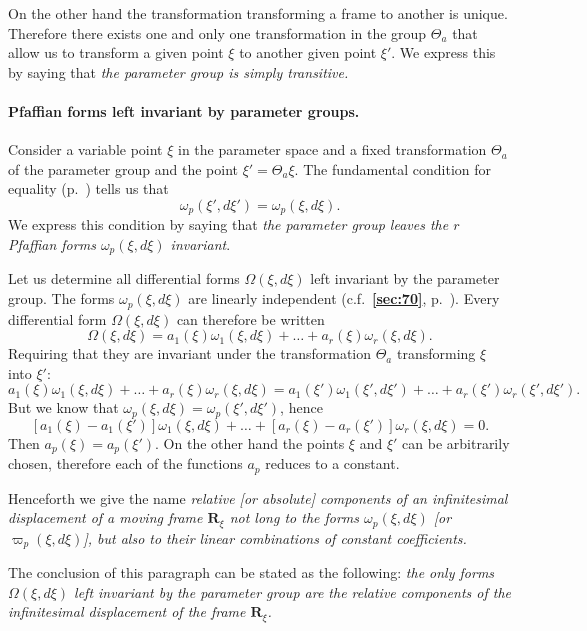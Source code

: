 \documentclass[leqno,11pt]{book}
\numberwithin{equation}{chapter}
\theoremstyle{shape1}
\theoremstyle{shapesmall}
\newcommand{\fsref}[1]{{\rm\textsection\textbf{\ref{sec:#1}}}}
\newcommand{\vp}{\varpi}
\begin{document}
On the other hand the transformation transforming a frame to another is unique. Therefore there exists one and only one transformation in the group $\Theta_{a}$ that allow us to transform a given point $\xi$ to another given point $\xi'$. We express this by saying that \emph{the parameter group is simply transitive.}

\paragraph{Pfaffian forms left invariant by parameter groups.}
\label{sec:80}
Consider a variable point $\xi$ in the parameter space and a fixed transformation $\Theta_{a}$ of the parameter group and the point $\xi'=\Theta_{a}\xi$. The fundamental condition for equality (p.~\pageref{sec:76}) tells us that
\[
\omega_{p}(\xi',d\xi')=\omega_{p}(\xi,d\xi).
\]
We express this condition by saying that \emph{the parameter group leaves the $r$ Pfaffian forms $\omega_{p}(\xi,d\xi)$ invariant}.

Let us determine all differential forms $\Omega(\xi,d\xi)$ left invariant by the parameter group. The forms $\omega_{p}(\xi,d\xi)$ are linearly independent (c.f.~\fsref{70}, p.~\pageref{sec:80}). Every differential form $\Omega(\xi,d\xi)$ can therefore be written
\[
\Omega(\xi,d\xi)=a_{1}(\xi)\omega_{1}(\xi,d\xi)+\dots+a_{r}(\xi)\omega_{r}(\xi,d\xi).
\]
Requiring that they are invariant under the transformation $\Theta_{a}$ transforming $\xi$ into $\xi'$:
\[
a_{1}(\xi)\omega_{1}(\xi,d\xi)+\dots+a_{r}(\xi)\omega_{r}(\xi,d\xi)=a_{1}(\xi')\omega_{1}(\xi',d\xi')+\dots+a_{r}(\xi')\omega_{r}(\xi',d\xi').
\]
But we know that $\omega_{p}(\xi,d\xi)=\omega_{p}(\xi',d\xi')$, hence
\[
[a_{1}(\xi)-a_{1}(\xi')]\omega_{1}(\xi,d\xi)+\dots+[a_{r}(\xi)-a_{r}(\xi')]\omega_{r}(\xi,d\xi)=0.
\]
Then $a_{p}(\xi)=a_{p}(\xi')$. On the other hand the points $\xi$ and $\xi'$ can be arbitrarily chosen, therefore each of the functions $a_{p}$ reduces to a constant.

Henceforth we give the name \emph{relative [or absolute] components of an infinitesimal displacement of a moving frame $\mathbf{R}_{\xi}$ not long to the forms $\omega_{p}(\xi,d\xi)$ [or $\vp_{p}(\xi,d\xi)$], but also to their linear combinations of constant coefficients.}

The conclusion of this paragraph can be stated as the following: \emph{the only forms $\Omega(\xi,d\xi)$ left invariant by the parameter group are the relative components of the infinitesimal displacement of the frame $\mathbf{R}_{\xi}$.}
\end{document}
